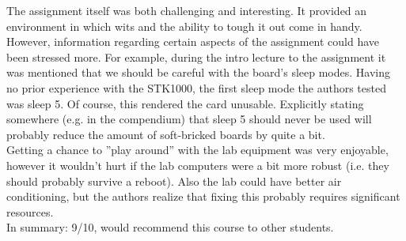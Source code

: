 The assignment itself was both challenging and interesting.
It provided an environment in which wits and the ability to tough it out come in handy.
However, information regarding certain aspects of the assignment could have been stressed more.
For example, during the intro lecture to the assignment\cite{lab-intro-lecture} it was mentioned that we should be careful with the board's sleep modes.
Having no prior experience with the STK1000, the first sleep mode the authors tested was sleep 5.
Of course, this rendered the card unusable.
Explicitly stating somewhere (e.g. in the compendium) that sleep 5 should never be used will probably reduce the amount of soft-bricked boards by quite a bit.
\\
Getting a chance to ''play around'' with the lab equipment was very enjoyable, however it wouldn't hurt if the lab computers were a bit more robust (i.e. they should probably survive a reboot).
Also the lab could have better air conditioning, but the authors realize that fixing this probably requires significant resources.
\\
In summary: 9/10, would recommend this course to other students.
